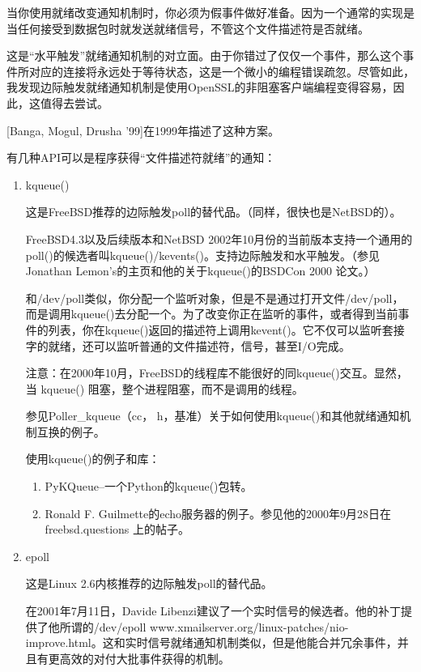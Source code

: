 \documentclass[12pt, twoside, a4paper, xetex]{report}
\begin{document}
	当你使用就绪改变通知机制时，你必须为假事件做好准备。因为一个通常的实现是当任何接受到数据包时就发送就绪信号，不管这个文件描述符是否就绪。
	
	这是“水平触发”就绪通知机制的对立面。由于你错过了仅仅一个事件，那么这个事件所对应的连接将永远处于等待状态，这是一个微小的编程错误疏忽。尽管如此，我发现边际触发就绪通知机制是使用OpenSSL的非阻塞客户端编程变得容易，因此，这值得去尝试。
	
	[Banga, Mogul, Drusha '99]在1999年描述了这种方案。
	
	有几种API可以是程序获得“文件描述符就绪”的通知：
	\begin{enumerate}
	
	\item kqueue()
	
	这是FreeBSD推荐的边际触发poll的替代品。（同样，很快也是NetBSD的）。
	
	FreeBSD4.3以及后续版本和NetBSD 2002年10月份的当前版本支持一个通用的poll()的候选者叫kqueue()/kevents()。支持边际触发和水平触发。（参见Jonathan Lemon's的主页和他的关于kqueue()的BSDCon 2000 论文。）
	
	和/dev/poll类似，你分配一个监听对象，但是不是通过打开文件/dev/poll，而是调用kqueue()去分配一个。为了改变你正在监听的事件，或者得到当前事件的列表，你在kqueue()返回的描述符上调用kevent()。它不仅可以监听套接字的就绪，还可以监听普通的文件描述符，信号，甚至I/O完成。
	
	注意：在2000年10月，FreeBSD的线程库不能很好的同kqueue()交互。显然，当 kqueue() 阻塞，整个进程阻塞，而不是调用的线程。
	
	参见Poller\_kqueue（cc， h，基准）关于如何使用kqueue()和其他就绪通知机制互换的例子。
	
	使用kqueue()的例子和库：
		\begin{enumerate}
			\item PyKQueue--一个Python的kqueue()包转。
			\item Ronald F. Guilmette的echo服务器的例子。参见他的2000年9月28日在\\freebsd.questions 上的帖子。
		\end{enumerate}
	\item epoll
	
	这是Linux 2.6内核推荐的边际触发poll的替代品。
	
	在2001年7月11日，Davide Libenzi建议了一个实时信号的候选者。他的补丁提供了他所谓的/dev/epoll www.xmailserver.org/linux-patches/nio-improve.html。这和实时信号就绪通知机制类似，但是他能合并冗余事件，并且有更高效的对付大批事件获得的机制。
	

\end{enumerate}
\end{document}
